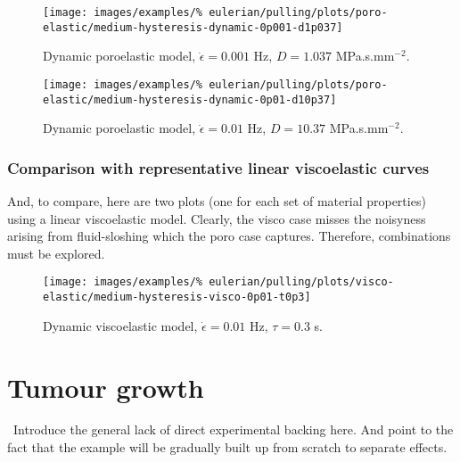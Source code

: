 \begin{figure}[!hptb]
\centering
\texttt{[image: images/examples/\%
eulerian/pulling/plots/poro-elastic/medium-hysteresis-dynamic-0p001-d1p037]}
\caption{Dynamic poroelastic model, $\dot{\epsilon}=0.001$ Hz, $D=1.037$
  MPa.s.mm$^{-2}$.}
\label{medium-hysteresis-dynamic-0p001-d1p037}
\end{figure}

\begin{figure}[!hptb]
\centering
\texttt{[image: images/examples/\%
eulerian/pulling/plots/poro-elastic/medium-hysteresis-dynamic-0p01-d10p37]}
\caption{Dynamic poroelastic model, $\dot{\epsilon}=0.01$ Hz, $D=10.37$
  MPa.s.mm$^{-2}$.}
\label{medium-hysteresis-dynamic-0p01-d10p37}
\end{figure}

\subsubsection{Comparison with representative linear viscoelastic
  curves}
\label{viscoelastic-hysteresis}

And, to compare, here are two plots (one for each set of material
properties) using a linear viscoelastic model. Clearly, the visco case
misses the noisyness arising from fluid-sloshing which the poro case
captures. Therefore, combinations must be explored.

\begin{figure}[!hptb]
\centering
\texttt{[image: images/examples/\%
eulerian/pulling/plots/visco-elastic/medium-hysteresis-visco-0p01-t0p3]}
\caption{Dynamic viscoelastic model, $\dot{\epsilon}=0.01$ Hz,
  $\tau=0.3$ s.}
\label{medium-hysteresis-visco-0p01-t0p3}
\end{figure}


\clearpage

\section{Tumour growth}
\label{tumour-growth}

\textbullet\ Introduce the general lack of direct experimental
backing here. And point to the fact that the example will be gradually
built up from scratch to separate effects.

